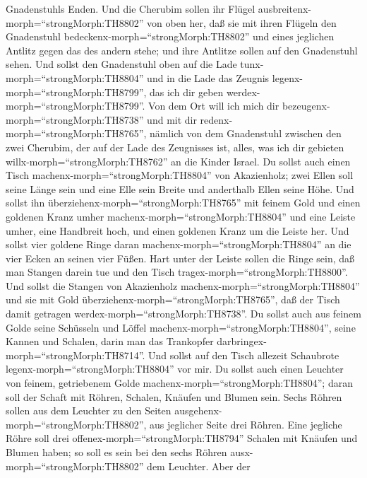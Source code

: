 Gnadenstuhls Enden.  Und die Cherubim sollen ihr Flügel
ausbreitenx-morph=``strongMorph:TH8802'' von oben her, daß sie mit ihren
Flügeln den Gnadenstuhl bedeckenx-morph=``strongMorph:TH8802'' und eines
jeglichen Antlitz gegen das des andern stehe; und ihre Antlitze sollen
auf den Gnadenstuhl sehen.  Und sollst den Gnadenstuhl oben
auf die Lade tunx-morph=``strongMorph:TH8804'' und in die Lade das
Zeugnis legenx-morph=``strongMorph:TH8799'', das ich dir geben
werdex-morph=``strongMorph:TH8799''.  Von dem Ort will ich
mich dir bezeugenx-morph=``strongMorph:TH8738'' und mit dir
redenx-morph=``strongMorph:TH8765'', nämlich von dem Gnadenstuhl
zwischen den zwei Cherubim, der auf der Lade des Zeugnisses ist, alles,
was ich dir gebieten willx-morph=``strongMorph:TH8762'' an die Kinder
Israel.  Du sollst auch einen Tisch
machenx-morph=``strongMorph:TH8804'' von Akazienholz; zwei Ellen soll
seine Länge sein und eine Elle sein Breite und anderthalb Ellen seine
Höhe.  Und sollst ihn
überziehenx-morph=``strongMorph:TH8765'' mit feinem Gold und einen
goldenen Kranz umher machenx-morph=``strongMorph:TH8804'' 
und eine Leiste umher, eine Handbreit hoch, und einen goldenen Kranz um
die Leiste her.  Und sollst vier goldene Ringe daran
machenx-morph=``strongMorph:TH8804'' an die vier Ecken an seinen vier
Füßen.  Hart unter der Leiste sollen die Ringe sein, daß
man Stangen darein tue und den Tisch
tragex-morph=``strongMorph:TH8800''.  Und sollst die
Stangen von Akazienholz machenx-morph=``strongMorph:TH8804'' und sie mit
Gold überziehenx-morph=``strongMorph:TH8765'', daß der Tisch damit
getragen werdex-morph=``strongMorph:TH8738''.  Du sollst
auch aus feinem Golde seine Schüsseln und Löffel
machenx-morph=``strongMorph:TH8804'', seine Kannen und Schalen, darin
man das Trankopfer darbringex-morph=``strongMorph:TH8714''.
 Und sollst auf den Tisch allezeit Schaubrote
legenx-morph=``strongMorph:TH8804'' vor mir.  Du sollst
auch einen Leuchter von feinem, getriebenem Golde
machenx-morph=``strongMorph:TH8804''; daran soll der Schaft mit Röhren,
Schalen, Knäufen und Blumen sein.  Sechs Röhren sollen aus
dem Leuchter zu den Seiten ausgehenx-morph=``strongMorph:TH8802'', aus
jeglicher Seite drei Röhren.  Eine jegliche Röhre soll drei
offenex-morph=``strongMorph:TH8794'' Schalen mit Knäufen und Blumen
haben; so soll es sein bei den sechs Röhren
ausx-morph=``strongMorph:TH8802'' dem Leuchter.  Aber der
